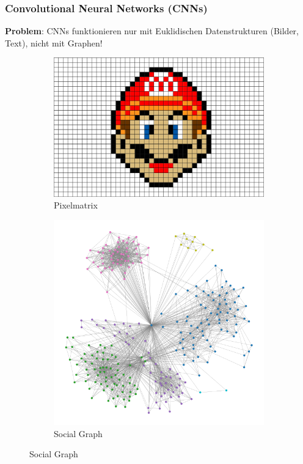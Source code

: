 \documentclass{beamer}
\begin{document}
\begin{frame}
  \frametitle{Convolutional Neural Networks (CNNs)}
  \textbf{Problem}: CNNs funktionieren nur mit Euklidischen Datenstrukturen (Bilder, Text), nicht mit Graphen!
  
    \begin{figure}[H]
      \centering
      \begin{subfigure}[b]{0.49\textwidth}
        \centering
        \includegraphics[width=\textwidth]{img/mario.png}
        \caption*{Pixelmatrix \cite{}}
      \end{subfigure}
      \begin{subfigure}[b]{0.49\textwidth}
        \centering
        \includegraphics[width=\textwidth]{img/social_graph.png}
        \caption*{Social Graph \cite{}}
      \end{subfigure}
    \end{figure}

\end{frame}
\end{document}
